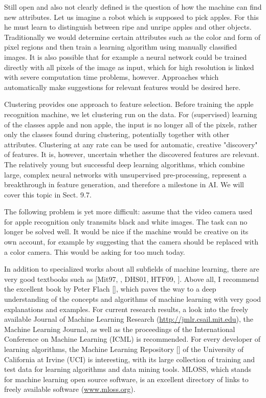 \documentclass[10pt]{article}
\begin{document}
Still open and also not clearly defined is the question of how the machine can find new attributes. Let us imagine a robot which is supposed to pick apples. For this he must learn to distinguish between ripe and unripe apples and other objects. Traditionally we would determine certain attributes such as the color and form of pixel regions and then train a learning algorithm using manually classified images. It is also possible that for example a neural network could be trained directly with all pixels of the image as input, which for high resolution is linked with severe computation time problems, however. Approaches which automatically make suggestions for relevant features would be desired here.


Clustering provides one approach to feature selection. Before training the apple recognition machine, we let clustering run on the data. For (supervised) learning of the classes apple and non apple, the input is no longer all of the pixels, rather only the classes found during clustering, potentially together with other attributes. Clustering at any rate can be used for automatic, creative "discovery" of features. It is, however, uncertain whether the discovered features are relevant. The relatively young but successful deep learning algorithms, which combine large, complex neural networks with unsupervised pre-processing, represent a breakthrough in feature generation, and therefore a milestone in AI. We will cover this topic in Sect. 9.7.

The following problem is yet more difficult: assume that the video camera used for apple recognition only transmits black and white images. The task can no longer be solved well. It would be nice if the machine would be creative on its own account, for example by suggesting that the camera should be replaced with a color camera. This would be asking for too much today.

In addition to specialized works about all subfields of machine learning, there are very good textbooks such as [Mit97, \cite{bishop2006prml}, DHS01, HTF09, \cite{alpaydin2004introduction}]. Above all, I recommend the excellent book by Peter Flach [\cite{flach2012machine}], which paves the way to a deep understanding of the concepts and algorithms of machine learning with very good explanations and examples. For current research results, a look into the freely available Journal of Machine Learning Research (\href{http://jmlr.csail.mit.edu}{http://jmlr.csail.mit.edu}), the Machine Learning Journal, as well as the proceedings of the International Conference on Machine Learning (ICML) is recommended. For every developer of learning algorithms, the Machine Learning Repository [\cite{blake1998uci}] of the University of California at Irvine (UCI) is interesting, with its large collection of training and test data for learning algorithms and data mining tools. MLOSS, which stands for machine learning open source software, is an excellent directory of links to freely available software (\href{http://www.mloss.org}{www.mloss.org}).
\end{document}
